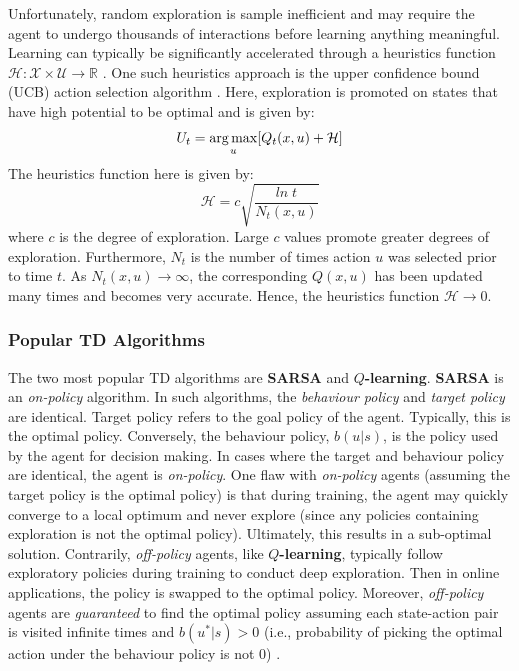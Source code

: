 Unfortunately, random exploration is sample inefficient and may require the agent to undergo thousands of interactions before learning anything meaningful. Learning can typically be significantly accelerated through a heuristics function $\mathcal{H}: \mathcal{X} \times \mathcal{U} \rightarrow \mathbb{R}$ \cite{harl}.  One such heuristics approach is the upper confidence bound (UCB) action selection algorithm \cite{ucb}. Here, exploration is promoted on states that have high potential to be optimal and is given by:
\begin{equation}
    U_t = \operatorname*{arg\,max}_u [Q_t(x, u) + \mathcal{H}] 
    \label{ucb}
\end{equation}
The heuristics function here is given by:
\begin{equation}
    \mathcal{H} = c \sqrt{\frac{ln \; t}{N_t(x, u)}}
\end{equation}
where $c$ is the degree of exploration.  Large $c$ values promote greater degrees of exploration. Furthermore, $N_t$ is the number of times action $u$ was selected prior to time $t$. As $N_t(x, u) \rightarrow \infty$, the corresponding $Q(x, u)$ has been updated many times and becomes very accurate.  Hence, the heuristics function $\mathcal{H} \rightarrow 0$. 

\subsubsection{Popular TD Algorithms}
The two most popular TD algorithms are \textbf{SARSA} and \textbf{$Q$-learning}.  \textbf{SARSA} is an \textit{on-policy} algorithm. In such algorithms, the \textit{behaviour policy} and \textit{target policy} are identical.  Target policy refers to the goal policy of the agent.  Typically, this is the optimal policy.  Conversely, the behaviour policy, $b(u|s)$, is the policy used by the agent for decision making. In cases where the target and behaviour policy are identical, the agent is \textit{on-policy}. One flaw with \textit{on-policy} agents (assuming the target policy is the optimal policy) is that during training, the agent may quickly converge to a local optimum and never explore (since any policies containing exploration is not the optimal policy).  Ultimately, this results in a sub-optimal solution.  Contrarily, \textit{off-policy} agents, like \textbf{$Q$-learning}, typically follow exploratory policies during training to conduct deep exploration.  Then in online applications, the policy is swapped to the optimal policy. Moreover, \textit{off-policy} agents are \textit{guaranteed} to find the optimal policy assuming each state-action pair is visited infinite times and $b(u^* | s) > 0$ (i.e., probability of picking the optimal action under the behaviour policy is not 0) \cite{td}.

